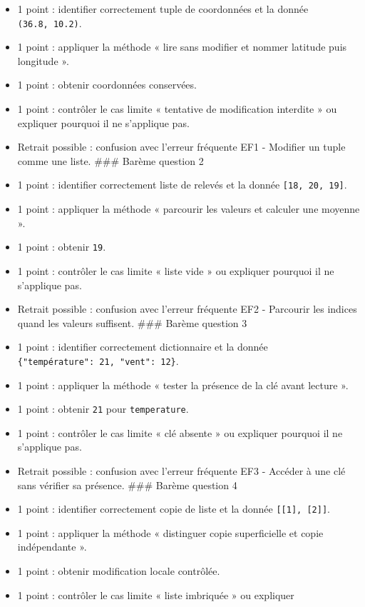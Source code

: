 \begin{itemize}
\tightlist
\item
  1 point : identifier correctement tuple de coordonnées et la donnée
  \texttt{(36.8,\ 10.2)}.
\item
  1 point : appliquer la méthode « lire sans modifier et nommer latitude
  puis longitude ».
\item
  1 point : obtenir coordonnées conservées.
\item
  1 point : contrôler le cas limite « tentative de modification
  interdite » ou expliquer pourquoi il ne s'applique pas.
\item
  Retrait possible : confusion avec l'erreur fréquente EF1 - Modifier un
  tuple comme une liste. \#\#\# Barème question 2
\item
  1 point : identifier correctement liste de relevés et la donnée
  \texttt{{[}18,\ 20,\ 19{]}}.
\item
  1 point : appliquer la méthode « parcourir les valeurs et calculer une
  moyenne ».
\item
  1 point : obtenir \texttt{19}.
\item
  1 point : contrôler le cas limite « liste vide » ou expliquer pourquoi
  il ne s'applique pas.
\item
  Retrait possible : confusion avec l'erreur fréquente EF2 - Parcourir
  les indices quand les valeurs suffisent. \#\#\# Barème question 3
\item
  1 point : identifier correctement dictionnaire et la donnée
  \texttt{\{"température":\ 21,\ "vent":\ 12\}}.
\item
  1 point : appliquer la méthode « tester la présence de la clé avant
  lecture ».
\item
  1 point : obtenir \texttt{21} pour \texttt{temperature}.
\item
  1 point : contrôler le cas limite « clé absente » ou expliquer
  pourquoi il ne s'applique pas.
\item
  Retrait possible : confusion avec l'erreur fréquente EF3 - Accéder à
  une clé sans vérifier sa présence. \#\#\# Barème question 4
\item
  1 point : identifier correctement copie de liste et la donnée
  \texttt{{[}{[}1{]},\ {[}2{]}{]}}.
\item
  1 point : appliquer la méthode « distinguer copie superficielle et
  copie indépendante ».
\item
  1 point : obtenir modification locale contrôlée.
\item
  1 point : contrôler le cas limite « liste imbriquée » ou expliquer

\end{itemize}
